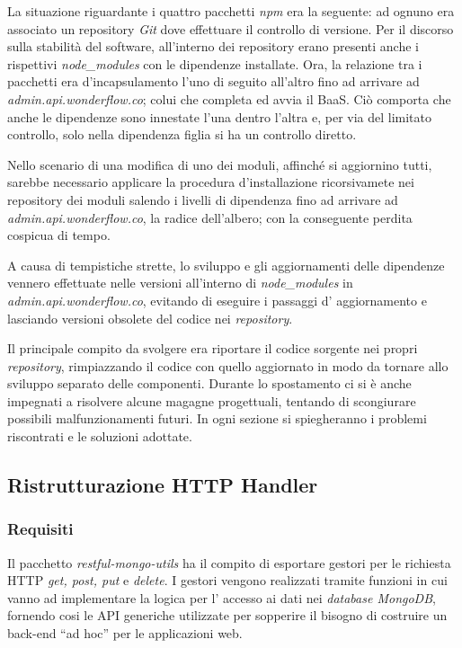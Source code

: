 La situazione riguardante i quattro pacchetti \textit{npm} era la seguente: ad
ognuno era associato un repository \textit{Git} dove effettuare il controllo di
versione. Per il discorso sulla stabilità del software, all'interno dei
repository erano presenti anche i rispettivi \textit{node\_modules} con le
dipendenze installate. Ora, la relazione tra i pacchetti era d'incapsulamento
l'uno di seguito all'altro fino ad arrivare ad \textit{admin.api.wonderflow.co};
colui che completa ed avvia il \gls{BaaS}. Ciò comporta che anche le dipendenze
sono innestate l'una dentro l'altra e, per via del limitato controllo, solo
nella dipendenza figlia si ha un controllo diretto.

Nello scenario di una modifica di uno dei moduli, affinché si aggiornino
tutti, sarebbe necessario applicare la procedura d'installazione ricorsivamete
nei repository dei moduli salendo i livelli di dipendenza fino ad arrivare ad
\textit{admin.api.wonderflow.co}, la radice dell'albero; con la conseguente
perdita cospicua di tempo.

A causa di tempistiche strette, lo sviluppo e gli aggiornamenti delle dipendenze
vennero effettuate nelle versioni all'interno di \textit{node\_modules} in
\textit{admin.api.wonderflow.co}, evitando di eseguire i passaggi d'
aggiornamento e lasciando versioni obsolete del codice nei \textit{repository}.

Il principale compito da svolgere era riportare il codice sorgente nei propri
\textit{repository}, rimpiazzando il codice con quello aggiornato in modo da
tornare allo sviluppo separato delle componenti. Durante lo spostamento ci si è
anche impegnati a risolvere alcune magagne progettuali, tentando di scongiurare
possibili malfunzionamenti futuri. In ogni sezione si spiegheranno i problemi
riscontrati e le soluzioni adottate.

\subsection{Ristrutturazione HTTP Handler}
\subsubsection{Requisiti}
Il pacchetto \textit{restful-mongo-utils} ha il compito di esportare gestori per
le richiesta HTTP \textit{get, post, put} e \textit{delete}. I gestori vengono
realizzati tramite funzioni in cui vanno ad implementare la logica per l'
accesso ai dati nei \textit{database MongoDB}, fornendo cosi le \gls{API}
generiche utilizzate per sopperire il bisogno di costruire un \gls{back-end}
``ad hoc'' per le applicazioni web.


